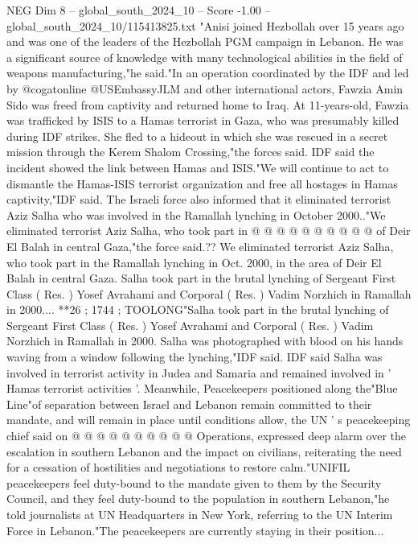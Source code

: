 \begin{textsample}{NEG Dim 8 – global\_south\_2024\_10 – Score -1.00 – global\_south\_2024\_10/115413825.txt}  \label{ex:f8_neg_192}
"Anisi joined Hezbollah over 15 years ago and was one of the leaders of the Hezbollah PGM campaign in Lebanon.
He was a significant source of knowledge with many technological abilities in the field of weapons manufacturing,"he said."In an operation coordinated by the IDF and led by @cogatonline @USEmbassyJLM and other international actors, Fawzia Amin Sido was freed from captivity and returned home to Iraq.
At 11-years-old, Fawzia was trafficked by ISIS to a Hamas terrorist in Gaza, who was presumably killed during IDF strikes.
She fled to a hideout in which she was rescued in a secret mission through the Kerem Shalom Crossing,"the forces said.
IDF said the incident showed the link between Hamas and ISIS."We will continue to act to dismantle the Hamas-ISIS terrorist organization and free all hostages in Hamas captivity,"IDF said.
The Israeli force also informed that it eliminated terrorist Aziz Salha who was involved in the Ramallah lynching in October 2000.."We eliminated terrorist Aziz Salha, who took part in @ @ @ @ @ @ @ @ @ @ of Deir El Balah in central Gaza,"the force said.??
We eliminated terrorist Aziz Salha, who took part in the Ramallah lynching in Oct. 2000, in the area of Deir El Balah in central Gaza.
Salha took part in the brutal lynching of Sergeant First Class ( Res. ) Yosef Avrahami and Corporal ( Res. ) Vadim Norzhich in Ramallah in 2000.... **26 ; 1744 ; TOOLONG"Salha took part in the brutal lynching of Sergeant First Class ( Res. ) Yosef Avrahami and Corporal ( Res. ) Vadim Norzhich in Ramallah in 2000.
Salha was photographed with blood on his hands waving from a window following the lynching,"IDF said.
IDF said Salha was involved in terrorist activity in Judea and Samaria and remained involved in ' Hamas terrorist activities '.
Meanwhile, Peacekeepers positioned along the"Blue Line"of separation between Israel and Lebanon remain committed to their mandate, and will remain in place until conditions allow, the UN ' s peacekeeping chief said on @ @ @ @ @ @ @ @ @ @ Operations, expressed deep alarm over the escalation in southern Lebanon and the impact on civilians, reiterating the need for a cessation of hostilities and negotiations to restore calm."UNIFIL peacekeepers feel duty-bound to the mandate given to them by the Security Council, and they feel duty-bound to the population in southern Lebanon,"he told journalists at UN Headquarters in New York, referring to the UN Interim Force in Lebanon."The peacekeepers are currently staying in their position...

\end{textsample}
